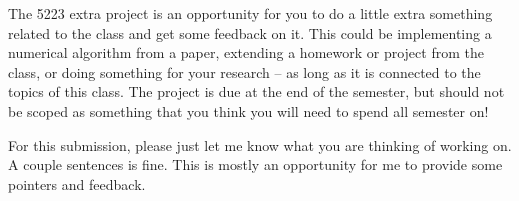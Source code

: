 \documentclass[12pt, leqno]{article}
\begin{document}

The 5223 extra project is an opportunity for you to do a little extra something
related to the class and get some feedback on it.  This could be implementing a
numerical algorithm from a paper, extending a homework or project from the class,
or doing something for your research -- as long as it is connected to the topics
of this class.  The project is due at the end of the
semester, but should not be scoped as something that you think you will need
to spend all semester on!

For this submission, please just let me know what you are thinking of working on.  
A couple sentences is fine.  This is mostly an opportunity for me to provide
some pointers and feedback.
\end{document}
